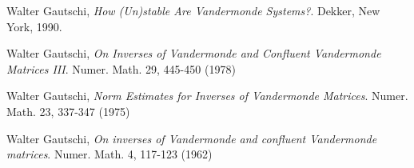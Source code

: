 \begin{thebibliography}{9}
    Walter Gautschi,
    \emph{How (Un)stable Are Vandermonde Systems?}.
    Dekker, New York,
    1990.

    Walter Gautschi,
    \emph{On Inverses of Vandermonde and Confluent Vandermonde Matrices III}.
    Numer. Math. 29, 445-450 (1978)

    Walter Gautschi,
    \emph{Norm Estimates for Inverses of Vandermonde Matrices}.
    Numer. Math. 23, 337-347 (1975)

    Walter Gautschi,
    \emph{On inverses of Vandermonde and confluent Vandermonde matrices}.
    Numer. Math. 4, 117-123 (1962)
\end{thebibliography}
